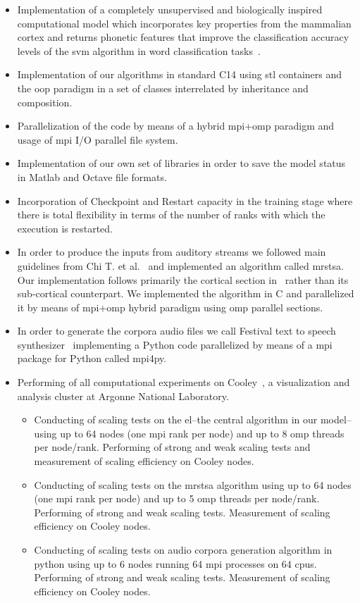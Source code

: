 \documentclass[10pt,journal,compsoc]{IEEEtran}
\newcommand{\CC}{C\nolinebreak\hspace{-.05em}\raisebox{.4ex}{\tiny\bf +}\nolinebreak\hspace{-.10em}\raisebox{.4ex}{\tiny\bf +}}
\begin{document}
\begin{itemize}

\item Implementation of a completely unsupervised and biologically inspired computational model which incorporates key properties from the mammalian cortex and returns phonetic features that improve the classification accuracy levels of the \gls{svm} algorithm in word classification tasks~\cite{Dematties2018}.

\item Implementation of our algorithms in standard \CC14 using \gls{stl} containers and the \gls{oop} paradigm in a set of classes interrelated by inheritance and composition.
\item Parallelization of the code by means of a hybrid \gls{mpi}+\gls{omp} paradigm and usage of \gls{mpi} I/O parallel file system.
\item Implementation of our own set of libraries in order to save the model status in Matlab and Octave file formats.
\item Incorporation of Checkpoint and Restart capacity in the training stage where there is total flexibility in terms of the number of ranks with which the execution is restarted.
\item In order to produce the inputs from auditory streams we followed main guidelines from Chi T. et al.~\cite{chi_2005} and implemented an algorithm called \gls{mrstsa}. Our implementation follows primarily the cortical section in~\cite{chi_2005} rather than its sub-cortical counterpart. We implemented the algorithm in C and parallelized it by means of \gls{mpi}+\gls{omp} hybrid paradigm using \gls{omp} parallel sections.
\item In order to generate the corpora audio files we call Festival text to speech synthesizer~\cite{festival2014} implementing a Python code parallelized by means of a \gls{mpi} package for Python called mpi4py.
\item Performing of all computational experiments on Cooley~\cite{noauthor_cooley_nodate}, a visualization and analysis cluster at Argonne National Laboratory.

	\begin{itemize}
		\item Conducting of scaling tests on the \gls{el}--the central algorithm in our model--using up to 64 nodes (one \gls{mpi} rank per node) and up to 8 \gls{omp} threads per node/rank. Performing of strong and weak scaling tests and measurement of scaling efficiency on Cooley nodes.
		\item Conducting of scaling tests on the \gls{mrstsa} algorithm using up to 64 nodes (one \gls{mpi} rank per node) and up to 5 \gls{omp} threads per node/rank. Performing of strong and weak scaling tests. Measurement of scaling efficiency on Cooley nodes.
		\item Conducting of scaling tests on audio corpora generation algorithm in python using up to 6 nodes running 64 \gls{mpi} processes on 64 \glspl{cpu}. Performing of strong and weak scaling tests. Measurement of scaling efficiency on Cooley nodes.


\end{itemize}
\end{itemize}
\end{document}
